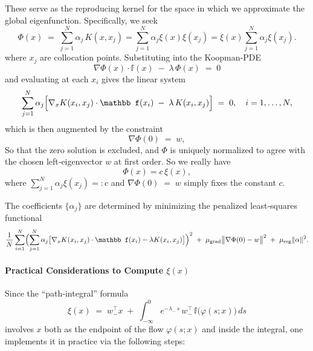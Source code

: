 \documentclass[11pt]{article}
\theoremstyle{plain}
\def\[{\begin{equation}}
\def\]{\end{equation}}
\begin{document}
These serve as the reproducing kernel for the space in which we approximate the global eigenfunction.  Specifically, we seek
\[
\Phi(x)\;=\;\sum_{j=1}^N \alpha_j\,K(x,x_j)= \sum_{j=1}^N \alpha_j \xi(x) \xi(x_j) = \xi(x) \sum_{j=1}^N \alpha_j \xi(x_j).
\]
where $x_j$ are collocation points.  Substituting into the Koopman‐PDE
\[
\nabla\Phi(x)\cdot {\mathbb f}(x)\;-\;\lambda\,\Phi(x)\;=\;0
\]
and evaluating at each \(x_i\) gives the linear system
\[
\sum_{j=1}^N \alpha_j\Bigl[\nabla_x K(x_i,x_j)\cdot {\mathbb f}(x_i)\;-\;\lambda\,K(x_i,x_j)\Bigr]
\;=\;0,
\quad i=1,\dots,N,
\]
which is then augmented by the constraint
\[
\nabla\Phi(0)\;=\;w,
\]
So that the zero solution is excluded, and $\Phi$
  is uniquely normalized to agree with the chosen left‐eigenvector  $w$ at first order. So we really have
\[
\Phi(x) = c \, \xi(x),
\] 
where ${\sum_{j=1}^N \alpha_j \xi(x_j)}{=:c}$ and $\nabla\Phi(0)\;=\;w$ simply fixes the constant $c$.

The coefficients \(\{\alpha_j\}\) are determined by minimizing the penalized least‐squares functional
\[
\frac{1}{N}\sum_{i=1}^N
\Bigl(
\sum_{j=1}^N \alpha_j\bigl[\nabla_x K(x_i,x_j)\cdot {\mathbb f}(x_i)-\lambda K(x_i,x_j)\bigr]
\Bigr)^2
\;+\;
\mu_{\rm grad}\bigl\|\nabla\Phi(0)-w\bigr\|^2
\;+\;
\mu_{\rm reg}\|\alpha\|^2.
\]

\paragraph{Practical Considerations to Compute \(\xi(x)\)}

Since the “path‐integral” formula
\[
\xi(x)
\;=\;
w_-^{\!\top}x
\;+\;
\int_{-\infty}^{0}
e^{-\lambda_-\,s}\,
w_-^{\!\top}\,\mathbb{f}\bigl(\varphi(s;x)\bigr)\,ds
\]
involves \(x\) both as the endpoint of the flow \(\varphi(s;x)\) and inside the integral, one implements it in practice via the following steps:
\end{document}

